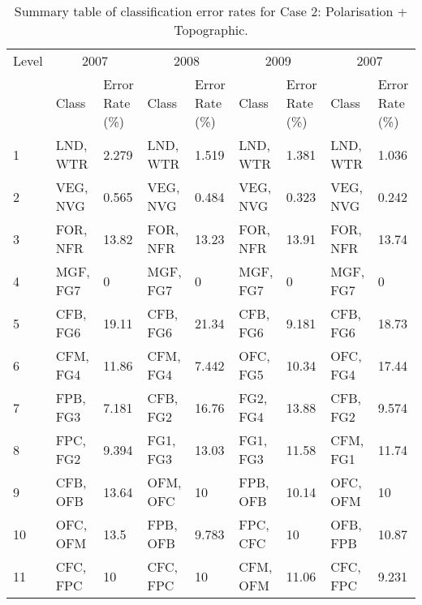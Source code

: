 \begin{appendices}
\begin{spacing}{1.0}
\begin{longtable}[h!]{ p{1cm} p{1.5cm} p{1cm} p{1.5cm} p{1cm} p{1.5cm} p{1cm} p{1.5cm} p{1cm} }
    \bottomrule
\end{longtable}
\end{spacing}

\begin{spacing}{1.0}
\begin{longtable}[h!]{ p{1cm} p{1.5cm} p{1cm} p{1.5cm} p{1cm} p{1.5cm} p{1cm} p{1.5cm} p{1cm} }

    \caption[Summary table of classification error rates for Case 2: Polarisation + Topographic.]{Summary table of classification error rates for Case 2: Polarisation + Topographic.}
    \label{tab: appendix-table.c2}\\
    
    \toprule
    Level & \multicolumn{2}{c}{2007} & \multicolumn{2}{c}{2008} & \multicolumn{2}{c}{2009} & \multicolumn{2}{c}{2007}\\
    \cmidrule{2-9}
    {} & Class & Error Rate (\%) & Class & Error Rate (\%) & Class & Error Rate (\%) & Class & Error Rate (\%)\\
    \midrule
    \endhead

    1 & LND, WTR & 2.279 & LND, WTR & 1.519 & LND, WTR & 1.381 & LND, WTR & 1.036\\
    \cmidrule{2-9}
    2 & VEG, NVG & 0.565 & VEG, NVG & 0.484 & VEG, NVG & 0.323 & VEG, NVG & 0.242\\
    \cmidrule{2-9}
    3 & FOR, NFR & 13.82 & FOR, NFR & 13.23 & FOR, NFR & 13.91 & FOR, NFR & 13.74\\
    \cmidrule{2-9}  
    4 & MGF, FG7 & 0 & MGF, FG7 & 0 & MGF, FG7 & 0 & MGF, FG7 & 0\\
    \cmidrule{2-9}    
    5 & CFB, FG6 & 19.11 & CFB, FG6 & 21.34 & CFB, FG6 & 9.181 & CFB, FG6 & 18.73\\
    \cmidrule{2-9}
    6 & CFM, FG4 & 11.86 & CFM, FG4 & 7.442 & OFC, FG5 & 10.34 & OFC, FG4 & 17.44\\
    \cmidrule{2-9}
    7 & FPB, FG3 & 7.181 & CFB, FG2 & 16.76 & FG2, FG4 & 13.88 & CFB, FG2 & 9.574\\
    \cmidrule{2-9}
    8 & FPC, FG2 & 9.394 & FG1, FG3 & 13.03 & FG1, FG3 & 11.58 & CFM, FG1 & 11.74\\
    \cmidrule{2-9}
    9 & CFB, OFB & 13.64 & OFM, OFC & 10 & FPB, OFB & 10.14 & OFC, OFM & 10\\
    \cmidrule{2-9}
    10 & OFC, OFM & 13.5 & FPB, OFB & 9.783 & FPC, CFC & 10 & OFB, FPB & 10.87\\
    \cmidrule{2-9}
    11 & CFC, FPC & 10 & CFC, FPC & 10 & CFM, OFM & 11.06 & CFC, FPC & 9.231\\
	

\end{longtable}
\end{spacing}
\end{appendices}
